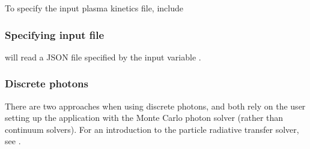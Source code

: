 \documentclass[letterpaper,10pt,english]{sphinxmanual}
\begin{document}
To specify the input plasma kinetics file, include


\subsubsection{Specifying input file}
\label{\detokenize{Applications/CdrPlasmaModel:specifying-input-file}}
 will read a JSON file specified by the input variable .


\subsubsection{Discrete photons}
\label{\detokenize{Applications/CdrPlasmaModel:discrete-photons}}
There are two approaches when using discrete photons, and both rely on the user setting up the application with the Monte Carlo photon solver (rather than continuum solvers).
For an introduction to the particle radiative transfer solver, see {\hyperref[\detokenize{Solvers/RTE:chap-montecarlorte}]{}}.
\end{document}
